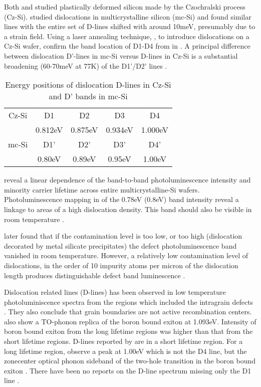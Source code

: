 Both \cite{drozdov76} and \cite{sauer85} studied plastically deformed silicon made by the Czochralski process (Cz-Si). \cite{tarasov00} studied  dislocations in multicrystalline silicon (mc-Si) and found similar lines with the entire set of D-lines shifted with around 10meV, presumably due to a strain field. Using a laser annealing technique, \cite{staiger94}, to introduce dislocations on a Cz-Si wafer, confirm the band location of D1-D4 from \cite{sauer85} in \cite{tarasov00}. A principal difference between dislocation D'-lines in mc-Si versus D-lines in Cz-Si is a substantial broadening (60-70meV at 77K) of the D1'/D2' lines \cite{tarasov00}.


\begin{table}[H]
\centering
\begin{tabular}{|c|c|c|c|c|}
\hline
Cz-Si \cite{drozdov76} & D1 & D2 & D3 & D4 \\
	& 0.812eV & 0.875eV & 0.934eV & 1.000eV \\
\hline
mc-Si \cite{tarasov00} & D1' & D2' & D3' & D4' \\
		& 0.80eV & 0.89eV & 0.95eV & 1.00eV \\
\hline
\end{tabular}
\caption{Energy positions of dislocation D-lines in Cz-Si and D' bands in mc-Si}
\label{tarasovlines}
\end{table}


\cite{tarasov00} reveal a linear dependence of the band-to-band photoluminescence intensity and minority carrier lifetime across entire multicrystalline-Si wafers. Photoluminescence mapping in \cite{tarasov00} of the 0.78eV (0.8eV) band intensity reveal a linkage to areas of a high dislocation density. This band should also be visible in room temperature \cite{tarasov00}.

\cite{tarasov01} later found that if the contamination level is too low, or too high (dislocation decorated by metal silicate precipitates) the defect photoluminescence band vanished in room temperature. However, a relatively low contamination level of dislocations, in the order of 10 impurity atoms per micron of the dislocation length produces distinguishable defect band luminescence \cite{tarasov01}. 

Dislocation related lines (D-lines) has been observed in low temperature photoluminiscence spectra from the regions which included the intragrain defects \cite{sugimoto06}. They also conclude that grain boundaries are not active recombination centers. \cite{sugimoto06} also show a TO-phonon replica of the boron bound exiton at 1.093eV. Intensity of boron bound exiton from the long lifetime regions was higher than that from the short lifetime regions. D-lines reported by \cite{sauer85} are in a short lifetime region. For a long lifetime region, \cite{sugimoto06} observe a peak at 1.00eV which is not the D4 line, but the zonecenter optical phonon sideband of the two-hole transition in the boron bound exiton \cite{dean67}. There have been no reports on the D-line spectrum missing only the D1 line \cite{sugimoto06}.


